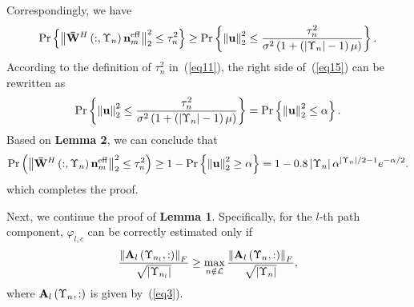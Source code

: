 \documentclass[a4paper,12pt]{article}
\begin{document}
{\begin{framed}
{\begin{equation}
\end{equation}
Correspondingly, we have
\begin{equation}\label{eq15}
\Pr \left\{ {\left\| {{{{\bf{\bar W}}}^H}\left( {:,{\Upsilon _n}} \right){\bf{n}}_m^{{\rm{eff}}}} \right\|_2^2 \le \tau _n^2} \right\} \ge \Pr \left\{ {\left\| {\bf{u}} \right\|_2^2 \le \frac{{\tau _n^2}}{{{\sigma ^2}\left( {1 + \left( {\left| {{\Upsilon _n}} \right| - 1} \right)\mu } \right)}}} \right\}.
\end{equation}
According to the definition of ${{\tau _n^2}}$ in~(\ref{eq11}), the right side of~(\ref{eq15}) can be rewritten as
\begin{equation}\label{eq16}
\Pr \left\{ {\left\| {\bf{u}} \right\|_2^2 \le \frac{{\tau _n^2}}{{{\sigma ^2}\left( {1 + \left( {\left| {{\Upsilon _n}} \right| - 1} \right)\mu } \right)}}} \right\} = \Pr \left\{ {\left\| {\bf{u}} \right\|_2^2 \le \alpha } \right\}.
\end{equation}
Based on \textbf{Lemma 2}, we can conclude that
\begin{equation}\label{eq17}
\Pr \left( {\left\| {{{{\bf{\bar W}}}^H}\left( {:,{\Upsilon _n}} \right){\bf{n}}_m^{{\rm{eff}}}} \right\|_2^2 \le \tau _n^2} \right) \ge 1 - \Pr \left\{ {\left\| {\bf{u}} \right\|_2^2 \ge \alpha } \right\} = 1 - 0.8\left| {{\Upsilon _n}} \right|{\alpha ^{\left| {{\Upsilon _n}} \right|/2 - 1}}{e^{ - \alpha /2}}.
\end{equation}
which completes the proof.

Next, we continue the proof of \textbf{Lemma 1}. Specifically, for the ${l}$-th path component, ${{\varphi _{l,c}}}$ can be correctly estimated only if
\begin{equation}\label{eq18}
\frac{{{{\left\| {{{\bf{A}}_l}\left( {{\Upsilon _{{n_l}}},:} \right)} \right\|}_F}}}{{\sqrt {\left| {{\Upsilon _{{n_l}}}} \right|} }} \ge \mathop {\max }\limits_{n \notin {\cal L}} \frac{{{{\left\| {{{\bf{A}}_l}\left( {{\Upsilon _n},:} \right)} \right\|}_F}}}{{\sqrt {\left| {{\Upsilon _n}} \right|} }},
\end{equation}
where ${{{{\bf{A}}_l}\left( {{\Upsilon _n},:} \right)}}$ is given by~(\ref{eq3}).

}
\end{framed}}
\end{document}
